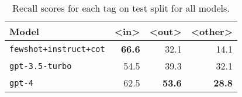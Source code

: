 \begin{table}[t]
    \centering
    \begin{tabular}{lrrr}
        \toprule
        \textbf{Model} & \textbf{<in>} & \textbf{<out>} & \textbf{<other>} \\ \midrule
        \texttt{fewshot+instruct+cot} & \textbf{66.6} & 32.1 & 14.1 \\ \midrule
        \texttt{gpt-3.5-turbo} & 54.5 & 39.3 & 32.1  \\ \midrule
        \texttt{gpt-4} & 62.5 & \textbf{53.6} & \textbf{28.8}  \\ \bottomrule
    \end{tabular}
    \caption{Recall scores for each tag on test split for all models.}
    \label{tab:football-results-rec}
\end{table}
